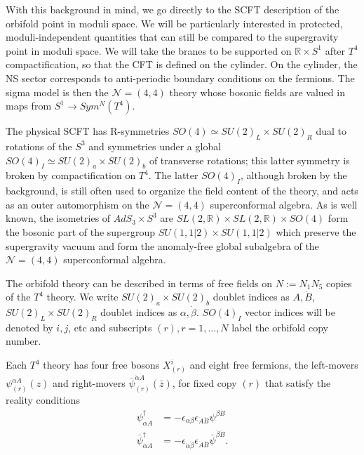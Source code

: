 \documentclass[11pt]{amsart}
\newcommand{\mbb}{\mathbb}
\newcommand{\mc}{\mathcal}
\newcommand{\R}{\mbb R}
\theoremstyle{thm}
\numberwithin{equation}{subsection}
\theoremstyle{def}
\theoremstyle{rem}
\begin{document}
With this background in mind, we go directly to the SCFT description of the orbifold point in moduli space. We will be particularly interested in protected, moduli-independent quantities that can still be compared to the supergravity point in moduli space. We will take the branes to be supported on $\R \times S^1$ after $T^4$ compactification, so that the CFT is defined on the cylinder. On the cylinder, the NS sector corresponds to anti-periodic boundary conditions on the fermions. The sigma model is then the $\mc N = (4,4)$ theory whose bosonic fields are valued in maps from $S^1 \rightarrow Sym^N(T^4)$.  

The physical SCFT has R-symmetries $SO(4) \simeq SU(2)_L \times SU(2)_R$ dual to rotations of the $S^3$ and symmetries under a global $SO(4)_I \simeq SU(2)_a \times SU(2)_b$ of transverse rotations; this latter symmetry is broken by compactification on $T^4$. The latter $SO(4)_I$, although broken by the background, is still often used to organize the field content of the theory, and acts as an outer automorphism on the $\mc N=(4, 4)$ superconformal algebra. As is well known, the isometries of $AdS_3 \times S^3$ are $SL(2, \R) \times SL(2, \R) \times SO(4)$ form the bosonic part of the supergroup $SU(1,1|2) \times SU(1,1|2)$ which preserve the supergravity vacuum and form the anomaly-free global subalgebra of the $\mc N= (4,4)$ superconformal algebra.

The orbifold theory can be described in terms of free fields on $N:= N_1N_5$ copies of the $T^4$ theory. We write $SU(2)_a \times SU(2)_b$ doublet indices as $A, \dot{B}$, $SU(2)_L\times SU(2)_R$ doublet indices as $\alpha, \dot{\beta}$. $SO(4)_I$ vector indices will be denoted by $i,j$, etc and subscripts $(r), r= 1,\ldots, N$ label the orbifold copy number.  

Each $T^4$ theory has four free bosons $X^i_{(r)}$ and eight free fermions, the left-movers $\psi^{\alpha \dot{A}}_{(r)}(z)$ and right-movers $\bar{\psi}^{\dot{\alpha} \dot{A}}_{(r)}(\bar{z})$, for fixed copy $(r)$ that satisfy the reality conditions
\begin{align*}
\psi^{\dagger}_{\alpha \dot{A}} &= -\epsilon_{\alpha \beta}\epsilon_{\dot{A} \dot{B}}\psi^{\beta \dot{B}} \\ 
\bar{\psi}^{\dagger}_{\dot{\alpha} \dot{A}} &= -\epsilon_{\dot{\alpha} \dot{\beta}}\epsilon_{\dot{A} \dot{B}}\bar{\psi}^{\dot{\beta} \dot{B}}.
\end{align*}
\end{document}
